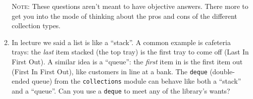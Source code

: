 \documentclass{article}
\begin{document}
\begin{enumerate}
  \textsc{Note}: These questions aren't meant to have objective answers.
  There more to get you into the mode of thinking about the pros and cons
  of the different collection types.

  \item In lecture we said a list is like a ``stack''. A common example is
  cafeteria trays: the \textit{last} item stacked (the top tray) is the first
  tray to come off (Last In First Out). A similar idea is a ``queue'': the
  \textit{first} item in is the first item out (First In First Out), like
  customers in line at a bank. The \texttt{deque} (double-ended queue) from the
  \texttt{collections} module can behave like both a ``stack'' and a ``queue''.
  Can you use a \texttt{deque} to meet any of the library's wants?
  \end{enumerate}
 
\end{document}
